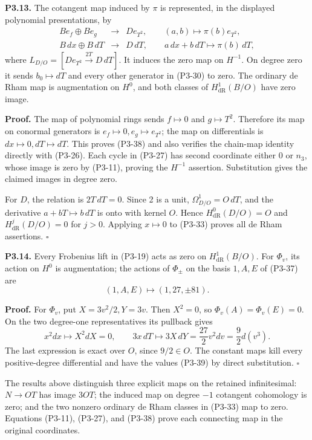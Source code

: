 \documentclass[
  10pt,
]{article}
\begin{document}
\textbf{P3.13.} The cotangent map induced by \(\pi\) is represented, in
the displayed polynomial presentations, by \[
\begin{array}{rcl}
B e_f\oplus B e_g&\longrightarrow&D e_{T^2},
\qquad(a,b)\longmapsto\pi(b)e_{T^2},\\
B\,dx\oplus B\,dT&\longrightarrow&D\,dT,
\qquad a\,dx+b\,dT\longmapsto\pi(b)\,dT,
\end{array}
\tag{P3-38}
\] where \(L_{D/O}=[D e_{T^2}\xrightarrow{2T}D\,dT]\). It induces the
zero map on \(H^{-1}\). On degree zero it sends \(b_0\mapsto dT\) and
every other generator in (P3-30) to zero. The ordinary de Rham map is
augmentation on \(H^0\), and both classes of \(H^1_{\mathrm{dR}}(B/O)\)
have zero image.

\textbf{Proof.} The map of polynomial rings sends \(f\mapsto0\) and
\(g\mapsto T^2\). Therefore its map on conormal generators is
\(e_f\mapsto0,e_g\mapsto e_{T^2}\); the map on differentials is
\(dx\mapsto0,dT\mapsto dT\). This proves (P3-38) and also verifies the
chain-map identity directly with (P3-26). Each cycle in (P3-27) has
second coordinate either 0 or \(n_3\), whose image is zero by (P3-11),
proving the \(H^{-1}\) assertion. Substitution gives the claimed images
in degree zero.

For \(D\), the relation is \(2T\,dT=0\). Since 2 is a unit,
\(\Omega^1_{D/O}=O\,dT\), and the derivative \(a+bT\mapsto b\,dT\) is
onto with kernel \(O\). Hence \(H^0_{\mathrm{dR}}(D/O)=O\) and
\(H^j_{\mathrm{dR}}(D/O)=0\) for \(j>0\). Applying \(x\mapsto0\) to
(P3-33) proves all de Rham assertions. \(\square\)

\textbf{P3.14.} Every Frobenius lift in (P3-19) acts as zero on
\(H^1_{\mathrm{dR}}(B/O)\). For \(\Phi_v\), its action on \(H^0\) is
augmentation; the actions of \(\Phi_\pm\) on the basis \(1,A,E\) of
(P3-37) are \[
(1,A,E)\longmapsto(1,27,\pm81).
\tag{P3-39}
\]

\textbf{Proof.} For \(\Phi_v\), put \(X=3v^2/2,Y=3v\). Then \(X^2=0\),
so \(\Phi_v(A)=\Phi_v(E)=0\). On the two degree-one representatives its
pullback gives \[
x^2dx\longmapsto X^2dX=0,\qquad
3x\,dT\longmapsto3X\,dY
=\frac{27}{2}v^2dv=\frac92d(v^3).
\] The last expression is exact over \(O\), since \(9/2\in O\). The
constant maps kill every positive-degree differential and have the
values (P3-39) by direct substitution. \(\square\)

The results above distinguish three explicit maps on the retained
infinitesimal: \(N\to OT\) has image \(3OT\); the induced map on degree
\(-1\) cotangent cohomology is zero; and the two nonzero ordinary de
Rham classes in (P3-33) map to zero. Equations (P3-11), (P3-27), and
(P3-38) prove each connecting map in the original coordinates.
\end{document}
